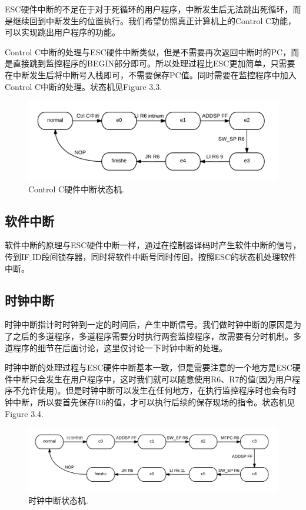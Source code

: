 ESC硬件中断的不足在于对于死循环的用户程序，中断发生后无法跳出死循环，而是继续回到中断发生的位置执行。我们希望仿照真正计算机上的Control C功能，可以实现跳出用户程序的功能。

Control C中断的处理与ESC硬件中断类似，但是不需要再次返回中断时的PC，而是直接跳到监控程序的BEGIN部分即可。所以处理过程比ESC更加简单，只需要在中断发生后将中断号入栈即可，不需要保存PC值。同时需要在监控程序中加入Control C中断的处理。状态机见Figure 3.3.

\begin{figure}[H]
  \includegraphics[width=\linewidth]{Figures/ctrl_c.png}
  \caption{Control C硬件中断状态机.}
\end{figure}

\subsection{软件中断}

软件中断的原理与ESC硬件中断一样，通过在控制器译码时产生软件中断的信号，传到IF$\_$ID段间锁存器，同时将软件中断号同时传回，按照ESC的状态机处理软件中断。

\subsection{时钟中断}

时钟中断指计时时钟到一定的时间后，产生中断信号。我们做时钟中断的原因是为了之后的多道程序，多道程序需要分时执行两套监控程序，故需要有分时机制。多道程序的细节在后面讨论，这里仅讨论一下时钟中断的处理。

时钟中断的处理过程与ESC硬件中断基本一致，但是需要注意的一个地方是ESC硬件中断只会发生在用户程序中，这时我们就可以随意使用R6、R7的值(因为用户程序不允许使用)。但是时钟中断可以发生在任何地方，在执行监控程序时也会有时钟中断，所以要首先保存R6的值，才可以执行后续的保存现场的指令。状态机见Figure 3.4.

\begin{figure}[H]
  \includegraphics[width=\linewidth]{Figures/clock.png}
  \caption{时钟中断状态机.}
\end{figure}




